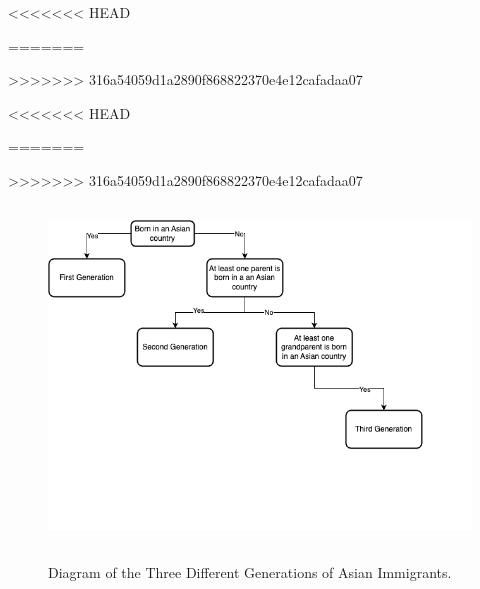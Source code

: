 \begin{landscape}

\end{landscape}

\newpage
\pagebreak



\newpage
\pagebreak



\pagebreak
\newpage



\newpage
\pagebreak



\pagebreak
\newpage

<<<<<<< HEAD

=======

>>>>>>> 316a54059d1a2890f868822370e4e12cafadaa07

\pagebreak
\newpage

<<<<<<< HEAD

=======

>>>>>>> 316a54059d1a2890f868822370e4e12cafadaa07

\pagebreak
\newpage



\pagebreak
\newpage

\begin{center}
\begin{figure}[H]
\caption{Diagram of the Three Different Generations of Asian Immigrants.}
\includegraphics[width=\textwidth, height=9cm]{diag.png} 
\label{fig:diag}
\end{figure}
\hfill%
\end{center}

